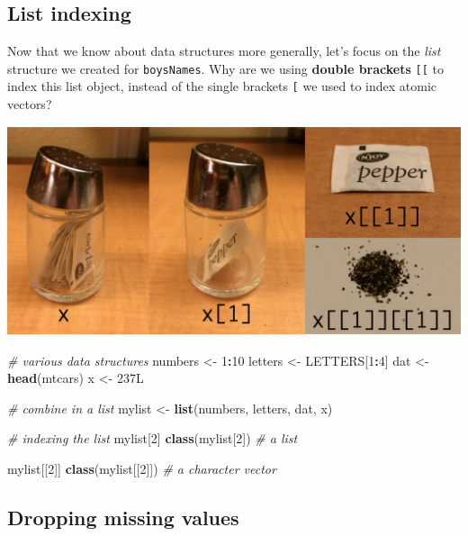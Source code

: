 \documentclass[]{book}
\newenvironment{Shaded}{\begin{snugshade}}{\end{snugshade}}
\newcommand{\KeywordTok}[1]{\textcolor[rgb]{0.13,0.29,0.53}{\textbf{#1}}}
\newcommand{\DecValTok}[1]{\textcolor[rgb]{0.00,0.00,0.81}{#1}}
\newcommand{\StringTok}[1]{\textcolor[rgb]{0.31,0.60,0.02}{#1}}
\newcommand{\CommentTok}[1]{\textcolor[rgb]{0.56,0.35,0.01}{\textit{#1}}}
\newcommand{\OperatorTok}[1]{\textcolor[rgb]{0.81,0.36,0.00}{\textbf{#1}}}
\newcommand{\NormalTok}[1]{#1}
\begin{document}
\subsection{List indexing}\label{list-indexing}

Now that we know about data structures more generally, let's focus on
the \emph{list} structure we created for \texttt{boysNames}. Why are we
using \textbf{double brackets} \texttt{{[}{[}} to index this list
object, instead of the single brackets \texttt{{[}} we used to index
atomic vectors?

\includegraphics{R/RDataWrangling/images/indexing_lists.png}

\begin{Shaded}
\begin{Highlighting}[]
\CommentTok{# various data structures}
\NormalTok{numbers <-}\StringTok{ }\DecValTok{1}\OperatorTok{:}\DecValTok{10}
\NormalTok{letters <-}\StringTok{ }\NormalTok{LETTERS[}\DecValTok{1}\OperatorTok{:}\DecValTok{4}\NormalTok{]}
\NormalTok{dat <-}\StringTok{ }\KeywordTok{head}\NormalTok{(mtcars)}
\NormalTok{x <-}\StringTok{ }\NormalTok{237L}

\CommentTok{# combine in a list}
\NormalTok{mylist <-}\StringTok{ }\KeywordTok{list}\NormalTok{(numbers, letters, dat, x)}

\CommentTok{# indexing the list}
\NormalTok{mylist[}\DecValTok{2}\NormalTok{]}
\KeywordTok{class}\NormalTok{(mylist[}\DecValTok{2}\NormalTok{]) }\CommentTok{# a list}

\NormalTok{mylist[[}\DecValTok{2}\NormalTok{]]}
\KeywordTok{class}\NormalTok{(mylist[[}\DecValTok{2}\NormalTok{]]) }\CommentTok{# a character vector}
\end{Highlighting}
\end{Shaded}

\subsection{Dropping missing values}\label{dropping-missing-values}
\end{document}
